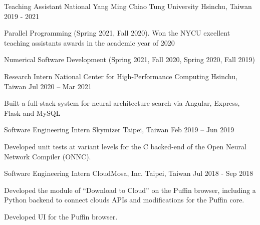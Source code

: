 

\begin{cventries}

  \cventry
    {Teaching Assistant} %
    {National Yang Ming Chiao Tung University} %
    {Hsinchu, Taiwan} %
    {2019 - 2021} %
    {
      \begin{cvitems} %
        \item {Parallel Programming (Spring 2021, Fall 2020). Won the NYCU excellent teaching assistants awards in the academic year of 2020}
        \item {Numerical Software Development (Spring 2021, Fall 2020, Spring 2020, Fall 2019)}
      \end{cvitems}
    }

  \cventry
    {Research Intern} %
    {National Center for High-Performance Computing} %
    {Hsinchu, Taiwan} %
    {Jul 2020 – Mar 2021} %
    {
      \begin{cvitems} %
        \item {Built a full-stack system for neural architecture search via Angular, Express, Flask and MySQL}
      \end{cvitems}
    }

  \cventry
    {Software Engineering Intern} %
    {Skymizer} %
    {Taipei, Taiwan} %
    {Feb 2019 – Jun 2019} %
    {
      \begin{cvitems} %
        \item {Developed unit tests at variant levels for the C backed-end of the Open Neural Network Compiler (ONNC).}
      \end{cvitems}
    }

  \cventry
    {Software Engineering Intern} %
    {CloudMosa, Inc.} %
    {Taipei, Taiwan} %
    {Jul 2018 - Sep 2018} %
    {
      \begin{cvitems} %
        \item {Developed the module of ``Download to Cloud'' on the Puffin browser, including a Python backend to
        connect clouds APIs and modifications for the Puffin core.}
        \item {Developed UI for the Puffin browser.}
      \end{cvitems}
    }


\end{cventries}

